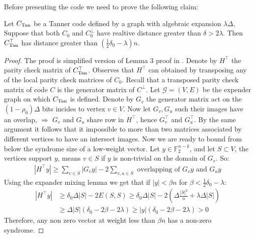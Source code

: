 Before presenting the code we need to prove the following claim:
\begin{claim}
  \label{claim:transposedtan}
  Let $C_{\text{Tan}}$ be a Tanner code defined by a graph with algebraic expansion $\lambda \Delta$, Suppose that both $C_{0}$ and $C_{0}^{\perp}$ have realtive distance greater than $\delta > 2\lambda$. Then $C_{\text{Tan}}^{\top}$ has distance greater than $(\frac{1}{2}\delta_{0} - \lambda)n$.
\end{claim}
\begin{proof}
  The proof is simplified version of Lemma 3 proof in \cite{Panteleev_2022}.  Denote by $H^\top$ the parity check matrix of $C_{\text{Tan}}^\top$. Observes that $H^\top$ can obtained by transposing any of the local parity check matrices of $C_0$. Recall that a transposed parity check matrix of code $C$ is the generator matrix of $C^\perp$. Let $\mathcal{G} = (V, E)$ be the expender graph on which $C_{\text{Tan}}$ is defined. Denote by $G_{v}$ the generator matrix act on the $(1-\rho_{0})\Delta$ bits incides to vertex $v \in V$. Now let $G_{v}, G_{u}$ such their images have an overlap, $\Rightarrow$ $G_{v}$ and $G_{u}$ share row in $H^{\top}$, hence $G^{\top}_{v}$ and $G^{\top}_{u}$. By the same argument it follows that it impossible to more than two matrices associated by different vertices to have an intersect images. Now we are ready to bound from below the syndrome size of a low-weight vector. 
  Let $y \in \mathbb{F}_{2}^{n-k}$, and let $S \subset V$, the vertices support $y$, means $v \in S$ if $y$ is non-trivial on the domain of $G_{v}$. So:
  \begin{equation*}
    \begin{split}
|H^\top y| \ge \sum_{v\in S}{ |G_{v}y|  } - 2\sum_{v,u\in S}{ \text{ overlapping of } G_{v}y \text{ and } G_{u}y  }   
    \end{split}
  \end{equation*}
  Using the expander mixing lemma \cite{hoory2006expander} we get that if $|y| < \beta n$ for $\beta < \frac{1}{2}\delta_0 - \lambda$:
     \begin{equation*}
    \begin{split}
      | H^\top y | & \ge \delta_{0}\Delta|S| - 2E(S,S) \ge \delta_{0}\Delta|S| - 2\left( \Delta\frac{|S|^2}{n} + \lambda\Delta|S| \right) \\
      & \ge \Delta |S|\left( \delta_{0} - 2\beta - 2\lambda  \right) \ge |y| \left( \delta_{0} - 2\beta - 2\lambda  \right) > 0
    \end{split}
  \end{equation*}
  Therefore, any non zero vector at weight less than $\beta n$ has a non-zero syndrome.
\end{proof}

